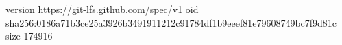 version https://git-lfs.github.com/spec/v1
oid sha256:0186a71b3ce25a3926b3491911212c91784df1b9eeef81e79608749bc7f9d81c
size 174916
